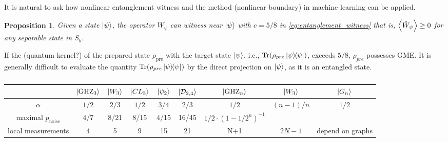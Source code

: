 \documentclass[
10pt,
aps,
pra,
linenumbers,
floatfix,
]{revtex4-2}
\theoremstyle{plain}
\newtheorem{proposition}{Proposition}
\theoremstyle{definition}
\newcommand{\ew}{\hat{W}}
\newcommand{\ghz}{\text{GHZ}}
\newcommand{\noise}{\text{noise}}
\newcommand{\dm}{\rho}
\newcommand{\D}{\mathcal{D}}
\begin{document}
It is natural to ask how nonlinear entanglement witness \cite{guhneNonlinearEntanglementWitnesses2006}  and the  method (nonlinear boundary) in machine learning can be applied. 

\begin{proposition}\label{thm:entanglement_witness_gme}
	Given a state $\ket{\psi}$,
	the  operator $\ew_{\psi}$ can witness   near $\ket{\psi}$ with $c=5/8$ in \cref{eq:entanglement_witness}
	that is, $\expval{\ew_{\psi}}\ge 0$ for any separable state in $S_b$.
\end{proposition}
If the  (quantum kernel?) of the prepared state $\dm_{\text{pre}}$ with the target state $\ket{\psi}$, i.e., $\Tr(\dm_{pre}\op{\psi})$, exceeds $5/8$, $\dm_{pre}$ possesses GME.
It is generally difficult to evaluate the quantity $\Tr(\dm_{pre}\op{\psi})$ by the direct projection on $\ket{\psi}$, as it is an entangled state.
\begin{table}[!ht]
\centering
\begin{tabular}{c|c|c|c|c|c|c|c|c}
	 & $\ket{\ghz_3}$ & $\ket{W_3}$ & $\ket{CL_3}$ & $\ket{\psi_2}$ & $\ket{\D_{2,4}}$ & $\ket{\ghz_n}$ & $\ket{W_3}$ & $\ket{G_n}$ \\
	\hline
	$\alpha$ & $1/2$ & $2/3$ & $1/2$ & $3/4$ & $2/3$ & $1/2$ & $(n-1)/n$ & $1/2$ \\
	maximal $p_{\noise}$ & 4/7 & 8/21 & 8/15 & 4/15 & 16/45 & $1/2 \cdot (1-1/2^n)^{-1}$ & & \\
	local measurements & 4 & 5 & 9 & 15 & 21 & N+1 & $2N-1$ & depend on graphs \\
	\hline
\end{tabular}
\caption{\cite{guhneEntanglementDetection2009}}
\end{table}
\end{document}
